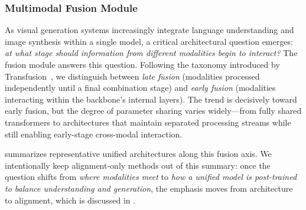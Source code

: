 \subsubsection{Multimodal Fusion Module}
\label{sec:arch_fusion}


As visual generation systems increasingly integrate language understanding and image synthesis within a single model, a critical architectural question emerges: \emph{at what stage should information from different modalities begin to interact?} The fusion module answers this question. Following the taxonomy introduced by Transfusion~\citep{zhou2024transfusion}, we distinguish between \emph{late fusion} (modalities processed independently until a final combination stage) and \emph{early fusion} (modalities interacting within the backbone's internal layers). The trend is decisively toward early fusion, but the degree of parameter sharing varies widely---from fully shared transformers to architectures that maintain separated processing streams while still enabling early-stage cross-modal interaction.

 summarizes representative unified architectures along this fusion axis. We intentionally keep alignment-only methods out of this summary: once the question shifts from \emph{where modalities meet} to \emph{how a unified model is post-trained to balance understanding and generation}, the emphasis moves from architecture to alignment, which is discussed in .

